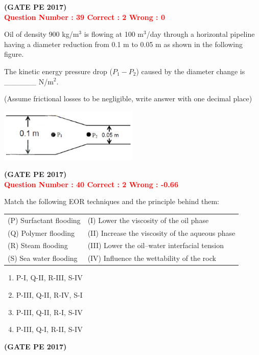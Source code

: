 \documentclass[12pt]{article}
\begin{document}
{\hfill\textbf{(GATE PE 2017)}\\[0.6cm]

\textcolor{red}{\textbf{Question Number : 39 \hfill Correct : 2  Wrong : 0}}

Oil of density 900 kg/m$^3$ is flowing at 100 m$^3$/day through a horizontal pipeline having a diameter reduction from 0.1 m to 0.05 m as shown in the following figure.

The kinetic energy pressure drop ($P_1 - P_2$) caused by the diameter change is \_\_\_\_\_\_ N/m$^2$.

(Assume frictional losses to be negligible, write answer with one decimal place)

\begin{center}
    \includegraphics[width=0.5\textwidth]{Figs/figQ_39.png}
\end{center}

\hfill\textbf{(GATE PE 2017)}\\[0.6cm]


\textcolor{red}{\textbf{Question Number : 40 \hfill Correct : 2  Wrong : -0.66}}

Match the following EOR techniques and the principle behind them:

\begin{tabular}{ll}
(P) Surfactant flooding & (I) Lower the viscosity of the oil phase \\
(Q) Polymer flooding & (II) Increase the viscosity of the aqueous phase \\
(R) Steam flooding & (III) Lower the oil–water interfacial tension \\
(S) Sea water flooding & (IV) Influence the wettability of the rock \\
\end{tabular}

\begin{enumerate}[label=(\Alph*)]
    \item P-I, Q-II, R-III, S-IV \\
    \item P-III, Q-II, R-IV, S-I \\
    \item P-III, Q-II, R-I, S-IV \\
    \item P-III, Q-I, R-II, S-IV
\end{enumerate}
\hfill\textbf{(GATE PE 2017)}\\[0.6cm]

}
\end{document}
